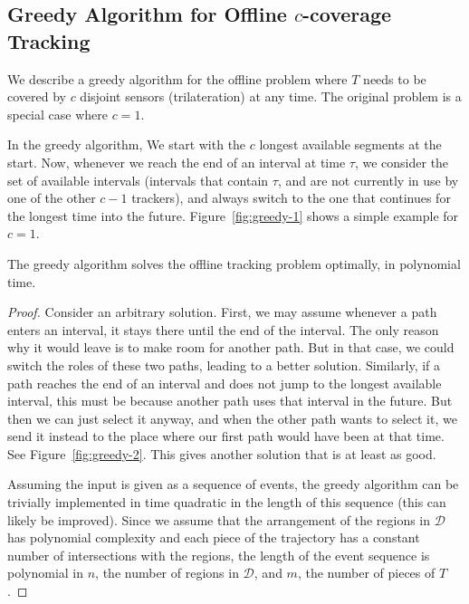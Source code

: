 \documentclass[runningheads]{llncs}
\newcommand {\script} [1] {\ensuremath {\mathcal {#1}}}
\begin{document}
  \subsection {Greedy Algorithm for Offline $c$-coverage Tracking}
    We describe a greedy algorithm for the offline problem where $T$ needs to be covered by $c$ disjoint sensors (trilateration) at any time. The original problem is a special case where $c=1$.
    
    In the greedy algorithm, We start with the $c$ longest available segments at the start.
    Now, whenever we reach the end of an interval at time $\tau$, we consider the set of available intervals (intervals that contain $\tau$, and are not currently in use by one of the other $c-1$ trackers), and always switch to the one that continues for the longest time into the future. 
    Figure~\ref {fig:greedy-1} shows a simple example for $c=1$.
  
    \begin {theorem} \label {thm:greedy}
    The greedy algorithm solves the offline tracking problem optimally, in polynomial time.
    \end {theorem}

    \begin {proof}
      Consider an arbitrary solution. First, we may assume whenever a path enters an interval, it stays there until the end of the interval. The only reason why it would leave is to make room for another path. But in that case, we could switch the roles of these two paths, leading to a better solution. Similarly, if a path reaches the end of an interval and does not jump to the longest available interval, this must be because another path uses that interval in the future. But then we can just select it anyway, and when the other path wants to select it, we send it instead to the place where our first path would have been at that time. 
      See Figure~\ref {fig:greedy-2}.
      This gives another solution that is at least as good.
      
      Assuming the input is given as a sequence of events, the greedy algorithm can be trivially implemented in time quadratic in the length of this sequence (this can likely be improved). Since we assume that the arrangement of the regions in $\script D$  has polynomial complexity and each piece of the trajectory has a constant number of intersections with the regions, the length of the event sequence is polynomial in $n$, the number of regions in $\script D$, and $m$, the number of pieces of $T$.
    \end {proof}
\end{document}
